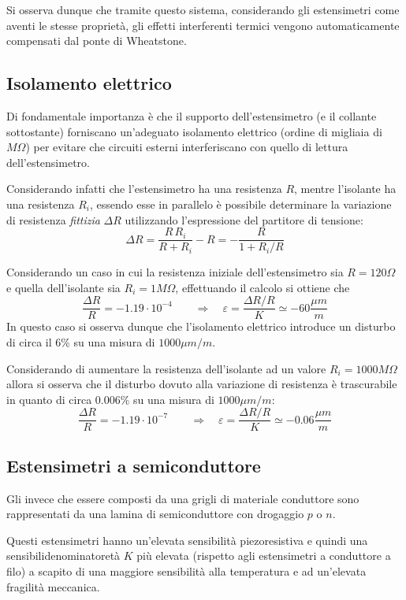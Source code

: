 		Si osserva dunque che tramite questo sistema, considerando gli estensimetri come aventi le stesse proprietà, gli effetti interferenti termici vengono automaticamente compensati dal ponte di Wheatstone.
	
	\subsection{Isolamento elettrico}
		Di fondamentale importanza è che il supporto dell'estensimetro (e il collante sottostante) forniscano un'adeguato isolamento elettrico (ordine di migliaia di $M\Omega$) per evitare che circuiti esterni interferiscano con quello di lettura dell'estensimetro.
		
		Considerando infatti che l'estensimetro ha una resistenza $R$, mentre l'isolante ha una resistenza $R_i$, essendo esse in parallelo è possibile determinare la variazione di resistenza \textit{fittizia} $\Delta R$ utilizzando l'espressione del partitore di tensione:
		\[ \Delta R = \frac{R \,R_i}{R+R_i} - R = - \frac R {1 + R_i/R}  \] 
		
		Considerando un caso in cui la resistenza iniziale dell'estensimetro sia $R=120\Omega$ e quella dell'isolante sia $R_i = 1M\Omega$, effettuando il calcolo si ottiene che
		\[ \frac{\Delta R}{R} = - 1.19\cdot 10^{-4} \qquad \Rightarrow \quad \varepsilon = \frac{\Delta R / R}{K} \simeq -60 \frac{\mu m}{m}  \]
		In questo caso si osserva dunque che l'isolamento elettrico introduce un disturbo di circa il $6\%$ su una misura di $1000 \mu m/m$.
		
		Considerando di aumentare la resistenza dell'isolante ad un valore $R_i = 1000 M\Omega$ allora si osserva che il disturbo dovuto alla variazione di resistenza è trascurabile in quanto di circa $0.006\%$ su una misura di $1000 \mu m / m$:
		\[ \frac{\Delta R}{R} = -1.19\cdot 10^{-7} \qquad \Rightarrow \quad \varepsilon= \frac{\Delta R/R}{K} \simeq -0.06 \frac{\mu m}{m}  \]
		
	\subsection{Estensimetri a semiconduttore}
		Gli  invece che essere composti da una grigli di materiale conduttore sono rappresentati da una lamina di semiconduttore con drogaggio $p$ o $n$.
		
		Questi estensimetri hanno un'elevata sensibilità piezoresistiva e quindi una sensibilidenominatoretà $K$ più elevata (rispetto agli estensimetri a conduttore a filo) a scapito di una maggiore sensibilità alla temperatura e ad un'elevata fragilità meccanica.
		
